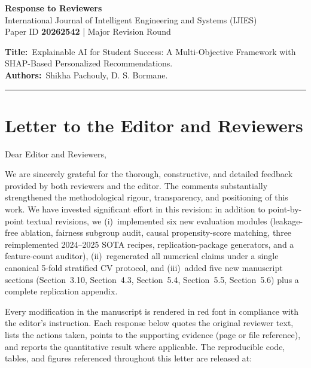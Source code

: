 \documentclass[11pt,a4paper]{article}
\newcommand{\sectref}[1]{Section~#1}
\begin{document}
\begin{center}
  {\LARGE\bfseries Response to Reviewers}\\[6pt]
  {\large International Journal of Intelligent Engineering and Systems (IJIES)}\\[2pt]
  Paper ID \textbf{20262542} \hspace{1em}|\hspace{1em} Major Revision Round
\end{center}

\vspace{4pt}
\noindent\textbf{Title:}~Explainable AI for Student Success: A Multi-Objective Framework with SHAP-Based Personalized Recommendations.\\
\textbf{Authors:}~Shikha Pachouly, D. S. Bormane.

\vspace{6pt}
\hrule
\vspace{6pt}

\section*{Letter to the Editor and Reviewers}

Dear Editor and Reviewers,

We are sincerely grateful for the thorough, constructive, and detailed feedback provided by both reviewers and the editor. The comments substantially strengthened the methodological rigour, transparency, and positioning of this work. We have invested significant effort in this revision: in addition to point-by-point textual revisions, we (i)~implemented six new evaluation modules (leakage-free ablation, fairness subgroup audit, causal propensity-score matching, three reimplemented 2024--2025 SOTA recipes, replication-package generators, and a feature-count auditor), (ii)~regenerated all numerical claims under a single canonical 5-fold stratified CV protocol, and (iii)~added five new manuscript sections (\sectref{3.10}, \sectref{4.3}, \sectref{5.4}, \sectref{5.5}, \sectref{5.6}) plus a complete replication appendix.

Every modification in the manuscript is rendered in \textcolor{revred}{red font} in compliance with the editor's instruction. Each response below quotes the original reviewer text, lists the actions taken, points to the supporting evidence (page or file reference), and reports the quantitative result where applicable. The reproducible code, tables, and figures referenced throughout this letter are released at:
\end{document}
